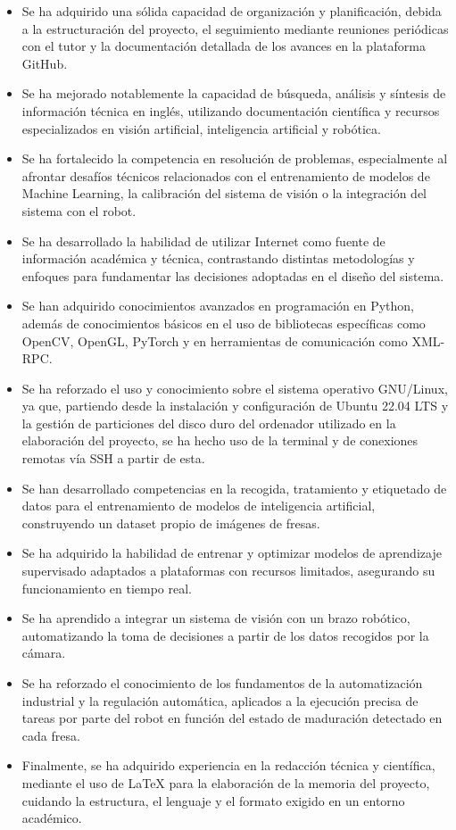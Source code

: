 \begin{itemize}
    \item Se ha adquirido una sólida capacidad de organización y planificación, debida a la estructuración del proyecto, el seguimiento mediante reuniones periódicas con el tutor y la documentación detallada de los avances en la plataforma GitHub.
    \item Se ha mejorado notablemente la capacidad de búsqueda, análisis y síntesis de información técnica en inglés, utilizando documentación científica y recursos especializados en visión artificial, inteligencia artificial y robótica.
    \item Se ha fortalecido la competencia en resolución de problemas, especialmente al afrontar desafíos técnicos relacionados con el entrenamiento de modelos de Machine Learning, la calibración del sistema de visión o la integración del sistema con el robot.
    \item Se ha desarrollado la habilidad de utilizar Internet como fuente de información académica y técnica, contrastando distintas metodologías y enfoques para fundamentar las decisiones adoptadas en el diseño del sistema.
    \item Se han adquirido conocimientos avanzados en programación en Python, además de conocimientos básicos en el uso de bibliotecas específicas como OpenCV, OpenGL, PyTorch y en herramientas de comunicación como XML-RPC.
    \item Se ha reforzado el uso y conocimiento sobre el sistema operativo GNU/Linux, ya que, partiendo desde la instalación y configuración de Ubuntu 22.04 LTS y la gestión de particiones del disco duro del ordenador utilizado en la elaboración del proyecto, se ha hecho uso de la terminal y de conexiones remotas vía SSH a partir de esta.
    \item Se han desarrollado competencias en la recogida, tratamiento y etiquetado de datos para el entrenamiento de modelos de inteligencia artificial, construyendo un dataset propio de imágenes de fresas.
    \item Se ha adquirido la habilidad de entrenar y optimizar modelos de aprendizaje supervisado adaptados a plataformas con recursos limitados, asegurando su funcionamiento en tiempo real.
    \item Se ha aprendido a integrar un sistema de visión con un brazo robótico, automatizando la toma de decisiones a partir de los datos recogidos por la cámara.
    \item Se ha reforzado el conocimiento de los fundamentos de la automatización industrial y la regulación automática, aplicados a la ejecución precisa de tareas por parte del robot en función del estado de maduración detectado en cada fresa.
    \item Finalmente, se ha adquirido experiencia en la redacción técnica y científica, mediante el uso de LaTeX para la elaboración de la memoria del proyecto, cuidando la estructura, el lenguaje y el formato exigido en un entorno académico.
\end{itemize}
